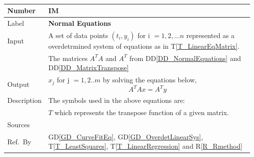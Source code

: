 \documentclass[12pt]{article}
\newcommand{\colAwidth}{0.13\textwidth}
\newcommand{\colBwidth}{0.82\textwidth}
\newcommand{\dref}[1]{GD\ref{#1}}
\newcommand{\ddref}[1]{DD\ref{#1}}
\newcommand{\tref}[1]{T\ref{#1}}
\newcounter{instnum} %
\newcommand{\rref}[1]{R\ref{#1}}
\begin{document}
~\newline
\noindent
\begin{minipage}{\textwidth}
	\renewcommand*{\arraystretch}{1.5}
	\begin{tabular}{| p{\colAwidth} | p{\colBwidth}|}
		\hline
		\rowcolor[gray]{0.9}
		Number& IM{instnum}\theinstnum \label{IM_NormalEquations}\\
		\hline
		Label& \bf Normal Equations\\
		\hline
		
		Input 
		& A set of data points $(t_i,y_i)$ for i $=1,2,...n$ represented as a overdetrmined system of equations as in \tref{T_LinearEqMatrix}.\\
		& The matrices $A^{T} A$ and $A^{T}$ from \ddref{DD_NormalEquations} and \ddref{DD_MatrixTranspose}\\
		\hline
		
		Output
		& $x_j$ for j $=1,2..m$ by solving the equations below,
		\begin{equation*}
		A^{T} Ax = A^{T}y
		\end{equation*}\\
		\hline
		Description & The symbols used in the above equations are:\\
		& $T$ which represents the transpose function of a given matrix.\\
		\hline
		Sources& ~\cite{Health1997}\\
		\hline
		
		Ref.\ By & \dref{GD_CurveFitEq}, \dref{GD_OverdetLinearSys}, \tref{T_LeastSquares}, \tref{T_LinearRegression} and \rref{R_Rmethod}\\
		\hline
	\end{tabular}
\end{minipage}\\


~\newline
\end{document}
